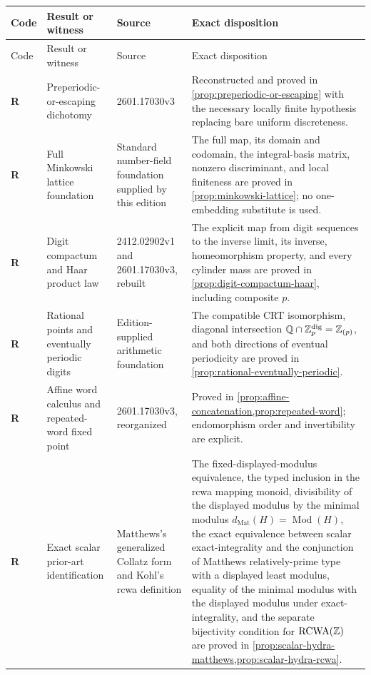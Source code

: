 \begingroup\small
\setlength{\tabcolsep}{3pt}
\begin{longtable}{@{}p{}p{}p{}p{}@{}}
\toprule
Code & Result or witness & Source & Exact disposition\\
\midrule
\endfirsthead
\toprule
Code & Result or witness & Source & Exact disposition\\
\midrule
\endhead
\textbf{R} & Preperiodic-or-escaping dichotomy & 2601.17030v3 &
Reconstructed and proved in \cref{prop:preperiodic-or-escaping} with the
necessary locally finite hypothesis replacing bare uniform discreteness.\\

\textbf{R} & Full Minkowski lattice foundation & Standard number-field
foundation supplied by this edition & The full map, its domain and codomain,
the integral-basis matrix, nonzero discriminant, and local finiteness are
proved in \cref{prop:minkowski-lattice}; no one-embedding substitute is used.\\

\textbf{R} & Digit compactum and Haar product law & 2412.02902v1 and
2601.17030v3, rebuilt & The explicit map from digit sequences to the inverse
limit, its inverse, homeomorphism property, and every cylinder mass are
proved in \cref{prop:digit-compactum-haar}, including composite $p$.\\

\textbf{R} & Rational points and eventually periodic digits & Edition-supplied
arithmetic foundation & The compatible CRT isomorphism, diagonal
intersection $\mathbb Q\cap\mathbb Z_p^{\mathrm{dig}}=\mathbb Z_{(p)}$, and both directions of
eventual periodicity are proved in
\cref{prop:rational-eventually-periodic}.\\

\textbf{R} & Affine word calculus and repeated-word fixed point &
2601.17030v3, reorganized & Proved in
\cref{prop:affine-concatenation,prop:repeated-word}; endomorphism order and
invertibility are explicit.\\

\textbf{R} & Exact scalar prior-art identification & Matthews's generalized
Collatz form and Kohl's rcwa definition & The fixed-displayed-modulus
equivalence, the typed inclusion in the rcwa mapping monoid, divisibility of
the displayed modulus by the minimal modulus
$d_{\mathrm{Mat}}(H)=\operatorname{Mod}(H)$, the exact equivalence between
scalar exact-integrality and the conjunction of Matthews relatively-prime type
with a displayed least modulus, equality of the minimal modulus with the
displayed modulus under exact-integrality, and the
separate bijectivity condition for
$\operatorname{RCWA}(\mathbb Z)$ are proved in
\cref{prop:scalar-hydra-matthews,prop:scalar-hydra-rcwa}.\\


\end{longtable}
